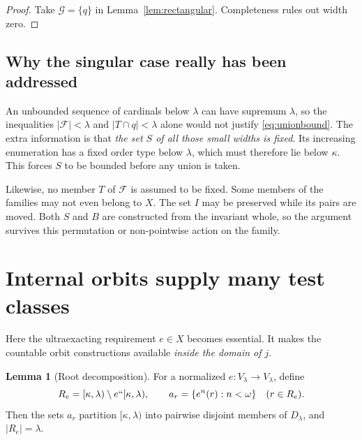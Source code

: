 \documentclass[11pt,letterpaper]{article}
\theoremstyle{definition}
\newtheorem{lemma}[definition]{Lemma}
\numberwithin{equation}{section}
\newcommand{\FF}{\mathcal F}
\newcommand{\calG}{\mathcal G}
\begin{document}
\begin{proof}
Take $\calG=\{q\}$ in Lemma~\ref{lem:rectangular}. Completeness rules out width zero.
\end{proof}

\subsection{Why the singular case really has been addressed}

An unbounded sequence of cardinals below $\lambda$ can have supremum $\lambda$, so the inequalities $|\FF|<\lambda$ and $|T\cap q|<\lambda$ alone would not justify \eqref{eq:unionbound}. The extra information is that \emph{the set $S$ of all those small widths is fixed}. Its increasing enumeration has a fixed order type below $\lambda$, which must therefore lie below $\kappa$. This forces $S$ to be bounded before any union is taken.

Likewise, no member $T$ of $\FF$ is assumed to be fixed. Some members of the families may not even belong to $X$. The set $I$ may be preserved while its pairs are moved. Both $S$ and $B$ are constructed from the invariant whole, so the argument survives this permutation or non-pointwise action on the family.

\section{Internal orbits supply many test classes}\label{sec:roots}

Here the ultraexacting requirement $e\in X$ becomes essential. It makes the countable orbit constructions available \emph{inside the domain of $j$}.

\begin{lemma}[Root decomposition]\label{lem:roots}
For a normalized $e:V_\lambda\to V_\lambda$, define
\[
 R_e=[\kappa,\lambda)\setminus e``[\kappa,\lambda),
 \qquad a_r=\{e^n(r):n<\omega\}\quad(r\in R_e).
\]
Then the sets $a_r$ partition $[\kappa,\lambda)$ into pairwise disjoint members of $D_\lambda$, and $|R_e|=\lambda$.
\end{lemma}
\end{document}
